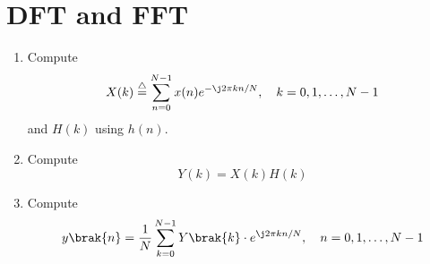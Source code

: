 \documentclass[journal,12pt,twocolumn]{IEEEtran}
\newcommand{\define}{\stackrel{\triangle}{=}}
\theoremstyle{remark}
\begin{document}
\section{DFT and FFT}
\begin{enumerate}[label=\thesection.\arabic*]
\item
Compute
\begin{equation}
X(k) \define \sum _{n=0}^{N-1}x(n) e^{-\j2\pi kn/N}, \quad k = 0,1,\dots, N-1
\end{equation}
and $H(k)$ using $h(n)$.
\item Compute 
\begin{equation}
Y(k) = X(k)H(k)
\label{eq:fp}
\end{equation}
\item Compute
\begin{equation}
y\brak{n}={\frac {1}{N}}\sum _{k=0}^{N-1}Y\brak{k}\cdot e^{\j 2\pi kn/N},\quad n = 0,1,\dots, N-1
\label{eq:inv-ft}
\end{equation}


\end{enumerate}
\end{document}
